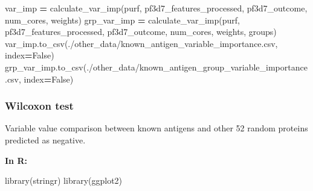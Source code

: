 \documentclass[
  11pt,
  oneside]{book}
\newenvironment{Shaded}{\begin{snugshade}}{\end{snugshade}}
\newcommand{\FunctionTok}[1]{\textcolor[rgb]{0.00,0.00,0.00}{#1}}
\newcommand{\NormalTok}[1]{#1}
\newcommand{\OperatorTok}[1]{\textcolor[rgb]{0.81,0.36,0.00}{\textbf{#1}}}
\newcommand{\StringTok}[1]{\textcolor[rgb]{0.31,0.60,0.02}{#1}}
\newcommand{\VariableTok}[1]{\textcolor[rgb]{0.00,0.00,0.00}{#1}}
\begin{document}
\begin{Shaded}
\begin{Highlighting}[]
\NormalTok{var\_imp }\OperatorTok{=}\NormalTok{ calculate\_var\_imp(purf, pf3d7\_features\_processed, pf3d7\_outcome, num\_cores, weights)}
\NormalTok{grp\_var\_imp }\OperatorTok{=}\NormalTok{ calculate\_var\_imp(purf, pf3d7\_features\_processed, pf3d7\_outcome, num\_cores, weights, groups)}
\NormalTok{var\_imp.to\_csv(}\StringTok{\textquotesingle{}./other\_data/known\_antigen\_variable\_importance.csv\textquotesingle{}}\NormalTok{, index}\OperatorTok{=}\VariableTok{False}\NormalTok{)}
\NormalTok{grp\_var\_imp.to\_csv(}\StringTok{\textquotesingle{}./other\_data/known\_antigen\_group\_variable\_importance.csv\textquotesingle{}}\NormalTok{, index}\OperatorTok{=}\VariableTok{False}\NormalTok{)}
\end{Highlighting}
\end{Shaded}

\hypertarget{wilcoxon-test}{%
\subsubsection{Wilcoxon test}\label{wilcoxon-test}}

Variable value comparison between known antigens and other 52 random proteins predicted as negative.

\textbf{In R: }

\begin{Shaded}
\begin{Highlighting}[]
\FunctionTok{library}\NormalTok{(stringr)}
\FunctionTok{library}\NormalTok{(ggplot2)}
\end{Highlighting}
\end{Shaded}
\end{document}
